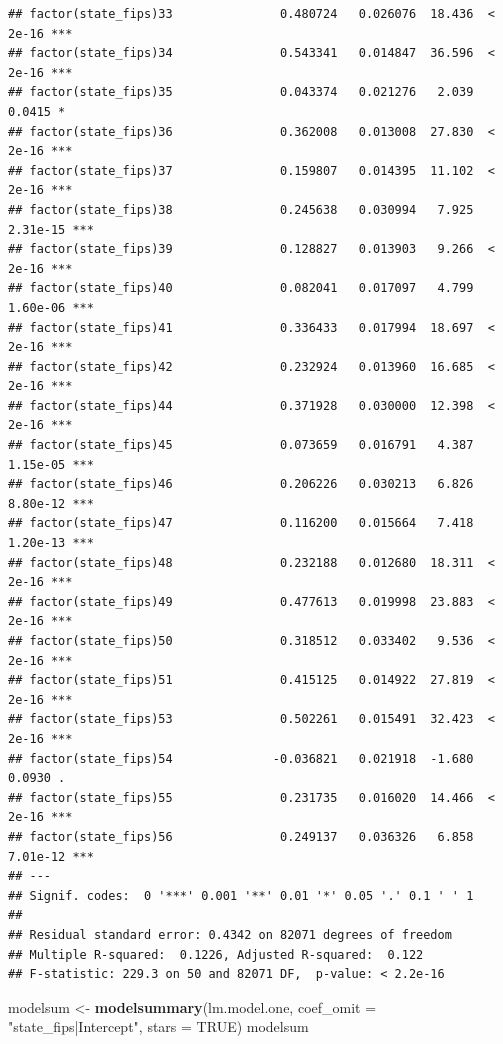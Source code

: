 \documentclass[
]{article}
\newenvironment{Shaded}{\begin{snugshade}}{\end{snugshade}}
\newcommand{\AttributeTok}[1]{\textcolor[rgb]{0.13,0.29,0.53}{#1}}
\newcommand{\ConstantTok}[1]{\textcolor[rgb]{0.56,0.35,0.01}{#1}}
\newcommand{\FunctionTok}[1]{\textcolor[rgb]{0.13,0.29,0.53}{\textbf{#1}}}
\newcommand{\NormalTok}[1]{#1}
\newcommand{\OtherTok}[1]{\textcolor[rgb]{0.56,0.35,0.01}{#1}}
\newcommand{\StringTok}[1]{\textcolor[rgb]{0.31,0.60,0.02}{#1}}
\begin{document}
\begin{verbatim}
## factor(state_fips)33               0.480724   0.026076  18.436  < 2e-16 ***
## factor(state_fips)34               0.543341   0.014847  36.596  < 2e-16 ***
## factor(state_fips)35               0.043374   0.021276   2.039   0.0415 *  
## factor(state_fips)36               0.362008   0.013008  27.830  < 2e-16 ***
## factor(state_fips)37               0.159807   0.014395  11.102  < 2e-16 ***
## factor(state_fips)38               0.245638   0.030994   7.925 2.31e-15 ***
## factor(state_fips)39               0.128827   0.013903   9.266  < 2e-16 ***
## factor(state_fips)40               0.082041   0.017097   4.799 1.60e-06 ***
## factor(state_fips)41               0.336433   0.017994  18.697  < 2e-16 ***
## factor(state_fips)42               0.232924   0.013960  16.685  < 2e-16 ***
## factor(state_fips)44               0.371928   0.030000  12.398  < 2e-16 ***
## factor(state_fips)45               0.073659   0.016791   4.387 1.15e-05 ***
## factor(state_fips)46               0.206226   0.030213   6.826 8.80e-12 ***
## factor(state_fips)47               0.116200   0.015664   7.418 1.20e-13 ***
## factor(state_fips)48               0.232188   0.012680  18.311  < 2e-16 ***
## factor(state_fips)49               0.477613   0.019998  23.883  < 2e-16 ***
## factor(state_fips)50               0.318512   0.033402   9.536  < 2e-16 ***
## factor(state_fips)51               0.415125   0.014922  27.819  < 2e-16 ***
## factor(state_fips)53               0.502261   0.015491  32.423  < 2e-16 ***
## factor(state_fips)54              -0.036821   0.021918  -1.680   0.0930 .  
## factor(state_fips)55               0.231735   0.016020  14.466  < 2e-16 ***
## factor(state_fips)56               0.249137   0.036326   6.858 7.01e-12 ***
## ---
## Signif. codes:  0 '***' 0.001 '**' 0.01 '*' 0.05 '.' 0.1 ' ' 1
## 
## Residual standard error: 0.4342 on 82071 degrees of freedom
## Multiple R-squared:  0.1226, Adjusted R-squared:  0.122 
## F-statistic: 229.3 on 50 and 82071 DF,  p-value: < 2.2e-16
\end{verbatim}

\begin{Shaded}
\begin{Highlighting}[]
\NormalTok{modelsum }\OtherTok{\textless{}{-}} \FunctionTok{modelsummary}\NormalTok{(lm.model.one, }
             \AttributeTok{coef\_omit =} \StringTok{"state\_fips|Intercept"}\NormalTok{,}
             \AttributeTok{stars =} \ConstantTok{TRUE}\NormalTok{)}
\NormalTok{modelsum}
\end{Highlighting}
\end{Shaded}
\end{document}
